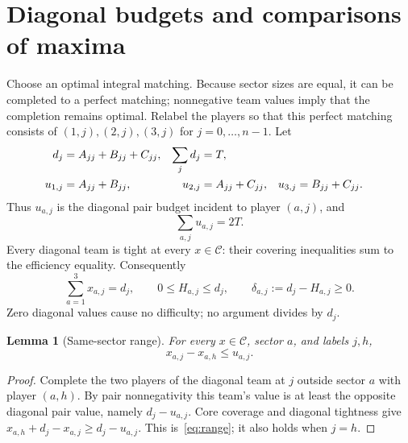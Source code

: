 \documentclass[11pt]{article}
\newtheorem{lemma}[theorem]{Lemma}
\theoremstyle{remark}
\newcommand{\core}{\mathcal C}
\begin{document}
\section{Diagonal budgets and comparisons of maxima}\label{sec:comparisons}
Choose an optimal integral matching. Because sector sizes are equal, it
can be completed to a perfect matching; nonnegative team values imply
that the completion remains optimal. Relabel the players so that this
perfect matching consists of $(1,j),(2,j),(3,j)$ for $j=0,\ldots,n-1$.
Let
\begin{align}
 d_j&=A_{jj}+B_{jj}+C_{jj}, &\sum_jd_j&=T,\label{eq:diagonal}\\
 u_{1,j}&=A_{jj}+B_{jj},&u_{2,j}&=A_{jj}+C_{jj},
 &u_{3,j}&=B_{jj}+C_{jj}.\notag
\end{align}
Thus $u_{a,j}$ is the diagonal pair budget incident to player $(a,j)$, and
\begin{equation}\label{eq:budget}
                     \sum_{a,j}u_{a,j}=2T.
\end{equation}
Every diagonal team is tight at every $x\in\core$: their covering
inequalities sum to the efficiency equality. Consequently
\begin{equation}\label{eq:caps}
     \sum_{a=1}^3x_{a,j}=d_j,\qquad
     0\le H_{a,j}\le d_j,\qquad
     \delta_{a,j}:=d_j-H_{a,j}\ge0.
\end{equation}
Zero diagonal values cause no difficulty; no argument divides by $d_j$.

\begin{lemma}[Same-sector range]\label{lem:range}
For every $x\in\core$, sector $a$, and labels $j,h$,
\begin{equation}\label{eq:range}
                         x_{a,j}-x_{a,h}\le u_{a,j}.
\end{equation}
\end{lemma}
\begin{proof}
Complete the two players of the diagonal team at $j$ outside sector $a$
with player $(a,h)$. By pair nonnegativity this team's value is at least
the opposite diagonal pair value, namely $d_j-u_{a,j}$.
Core coverage and diagonal tightness give
$x_{a,h}+d_j-x_{a,j}\ge d_j-u_{a,j}$.
This is~\eqref{eq:range}; it also holds when $j=h$.
\end{proof}
\end{document}
